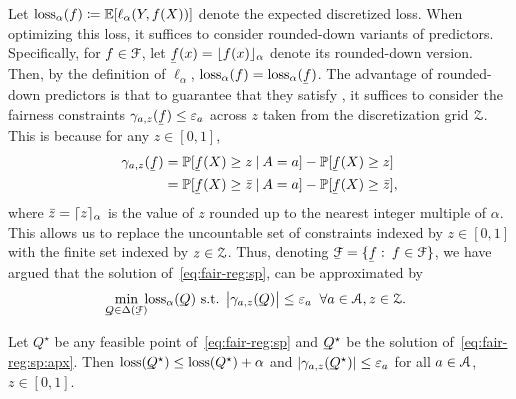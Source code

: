 \documentclass{article}
\begin{document}
Let $\textup{\mdseries loss}_\alpha(f)\coloneqq\mathbb{E}[\ell_\alpha(Y,f(X))]$ denote the expected discretized loss. When optimizing this loss, it suffices to consider rounded-down variants of predictors. Specifically,
for ${f\in\mathcal{F}}$, let $\underf(x)=\floors{f(x)}_\alpha$ denote its rounded-down version.
Then, by
the definition of $\ell_\alpha$, $\loss_\alpha(f)=\loss_\alpha(\underf)$. The advantage of rounded-down predictors is that to guarantee that they satisfy \sp, it suffices to consider the fairness constraints $\gamma_{a,z}(\underf)\le\eps_a$ across $z$ taken from the discretization grid $\mathcal{Z}$. This is because for any $z\in[0,1]$,
%
\begin{align}
\notag
\gamma_{a,z}(\underf)
  &=\P[\underf(X)\ge z\given A=a] - \P[\underf(X)\ge z]
\\
  &=\P[\underf(X)\ge \bar{z}\given A=a] - \P[\underf(X)\ge\bar{z}],
\label{eq:gamma:apx}
\end{align}
%
where $\bar{z}=\lceil z\rceil_\alpha$ is the value of $z$ rounded up to the nearest integer multiple of $\alpha$. This allows us to replace the uncountable set of constraints indexed by %
$z\in[0,1]$ with the finite set indexed by $z \in \mathcal{Z}$. Thus, denoting $\underF=\set{\underf:\:f\in\calF}$, we have argued that the solution of~\eqref{eq:fair-reg:sp}, can be approximated by%
%
\begin{align}
\label{eq:fair-reg:sp:apx}
\min_{\mathclap{\underQ\in\Delta(\underF)}}\;\loss_\alpha(\underQ)
\text{ s.t. }
  \bigAbs{\gamma_{a,z}(\underQ)}\le\eps_a
\;\;
  \text{$\forall a\in\calA, z\in\calZ$.}
\end{align}
%
%
\begin{theorem}
\label{thm:sp:apx}
Let $Q^\star$ be any feasible point of~\eqref{eq:fair-reg:sp} and $\underline{\smash{Q}\!\!}\,\,^\star$ be the solution of~\eqref{eq:fair-reg:sp:apx}. Then $\textup{\mdseries loss}(\underline{\smash{Q}\!\!}\,\,^\star)\le\textup{\mdseries loss}(Q^\star)+\alpha$
and $\left\lvert\gamma_{a,z}(\underline{\smash{Q}\!\!}\,\,^\star)\right\rvert\le\varepsilon_a$ for all $a\in\mathcal{A}$, $z\in[0,1]$.
\end{theorem}
\end{document}
